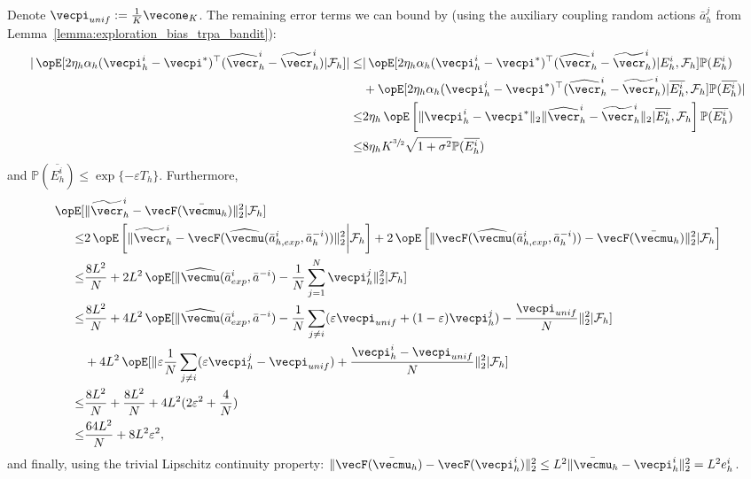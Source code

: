 Denote $\vecpi_{unif} := \frac{1}{K}\vecone_K$.
The remaining error terms we can bound by (using the auxiliary coupling random actions $\bar{a}_h^j$ from Lemma~\ref{lemma:exploration_bias_trpa_bandit}):
\begin{align*}
    |\Exop[2\eta_h\alpha_h (\vecpi_h^i - \vecpi^*)^\top (\widehat{\vecr}_h^i - \widetilde{\vecr}_h^i) | \mathcal{F}_h] | 
        \leq & |\Exop[2\eta_h\alpha_h (\vecpi_h^i - \vecpi^*)^\top (\widehat{\vecr}_h^i - \widetilde{\vecr}_h^i) | E_h^i, \mathcal{F}_h] \mathbb{P}(E_h^i) \\
        & + \Exop[2\eta_h\alpha_h (\vecpi_h^i - \vecpi^*)^\top (\widehat{\vecr}_h^i - \widetilde{\vecr}_h^i) | \overline{E_h^i}, \mathcal{F}_h]\mathbb{P}(\overline{E_h^i})| \\
    \leq & 2\eta_h \Exop\left[\|\vecpi_h^i - \vecpi^*\|_2 \|\widehat{\vecr}_h^i - \widetilde{\vecr}_h^i\|_2 | \overline{E_h^i}, \mathcal{F}_h\right] \mathbb{P}(\overline{E_h^i}) \\
    \leq & 8\eta_h K^{\sfrac{3}{2}} \sqrt{1 + \sigma^2} \mathbb{P}(\overline{E_h^i}) 
\end{align*}
and $\mathbb{P}(\overline{E_h^i}) \leq \exp\{-\varepsilon T_h\}$.
Furthermore,
\begin{align*}
    \Exop[&\|\widetilde{\vecr}_h^i - \vecF(\bar{\vecmu}_h)\|_2^2 | \mathcal{F}_{h}] \\
    \leq & 2\Exop\left[ \|\widetilde{\vecr}_h^i - \vecF(\widehat{\vecmu}(\bar{a}_{h,exp}^i, \bar{a}_h ^ {-i})) \|_2^2\middle|\mathcal{F}_{h}\right] + 2\Exop\left[ \|\vecF(\widehat{\vecmu}(\bar{a}_{h,exp}^i, \bar{a}_h ^ {-i})) - \vecF(\bar{\vecmu}_h)\|_2^2 | \mathcal{F}_{h}\right] \\
    \leq &  \frac{8 L^2}{N}  +  2L^2 \Exop[ \|\widehat{\vecmu}(\bar{a}_{exp}^i, \bar{a} ^ {-i}) - \frac{1}{N}\sum_{j=1}^N \vecpi^j_h\|_2^2 | \mathcal{F}_{h}] \\
    \leq &  \frac{8 L^2}{N}  +  4L^2 \Exop[ \|\widehat{\vecmu}(\bar{a}_{exp}^i, \bar{a} ^ {-i}) - \frac{1}{N}\sum_{j\neq i} (\varepsilon\vecpi_{unif} + (1-\varepsilon)\vecpi^j_h) - \frac{\vecpi_{unif}}{N} \|_2^2 | \mathcal{F}_{h}] \\
        &+ 4L^2 \Exop[ \| \varepsilon\frac{1}{N}\sum_{j\neq i} ( \varepsilon\vecpi^j_h - \vecpi_{unif}) +  \frac{\vecpi^i_h - \vecpi_{unif}}{N} \|_2^2 | \mathcal{F}_{h}] \\
    \leq &  \frac{8 L^2}{N}  +  \frac{8L^2}{N} + 4L^2 (2\varepsilon^2 + \frac{4}{N}) \\
    \leq & \frac{64 L ^2}{N} + 8 L^2 \varepsilon^2,
\end{align*}
and finally, using the trivial Lipschitz continuity property: $\|\vecF(\bar{\vecmu}_h) - \vecF(\vecpi_h^i)\|_2^2 \leq L^2 \|\bar{\vecmu}_h - \vecpi_h^i\|_2^2 = L^2 e_h^i$.

